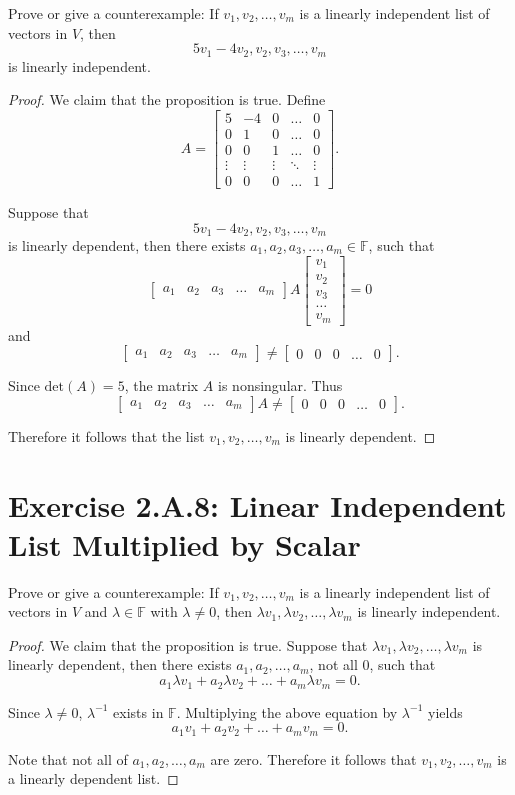 Prove or give a counterexample: If $v_1,v_2,\dots,v_m$ is a linearly independent list of vectors in $V$, then\[
5v_1-4v_2,v_2,v_3,\dots,v_m
\] is linearly independent.
\begin{proof}
We claim that the proposition is true. Define \[
A=\begin{bmatrix}
5&-4&0&\dots &0\\
0&1&0&\dots &0\\
0&0&1&\dots &0\\
\vdots&\vdots&\vdots&\ddots&\vdots\\
0&0&0&\dots &1
\end{bmatrix}.
\]

Suppose that \[
5v_1-4v_2,v_2,v_3,\dots,v_m
\] is linearly dependent, then there exists $a_1,a_2,a_3,\dots,a_m\in\mathbb{F}$, such that \[
\begin{bmatrix}
a_1&a_2&a_3&\dots &a_m
\end{bmatrix}
A
\begin{bmatrix}
v_1\\v_2\\v_3\\\dots\\v_m
\end{bmatrix}
=
0
\] and \[
\begin{bmatrix}
a_1&a_2&a_3&\dots &a_m
\end{bmatrix}\ne
\begin{bmatrix}
0&0&0&\dots &0
\end{bmatrix}.
\]

Since $\text{det}(A)=5$, the matrix $A$ is nonsingular. Thus \[
\begin{bmatrix}
a_1&a_2&a_3&\dots &a_m
\end{bmatrix}A\ne
\begin{bmatrix}
0&0&0&\dots &0
\end{bmatrix}.
\]

Therefore it follows that the list $v_1,v_2,\dots,v_m$ is linearly dependent.
\end{proof}

\section{Exercise 2.A.8: Linear Independent List Multiplied by Scalar}
Prove or give a counterexample: If $v_1,v_2,\dots,v_m$ is a linearly independent list of vectors in $V$ and $\lambda\in\mathbb{F}$ with $\lambda\ne 0$, then $\lambda v_1,\lambda v_2,\dots,\lambda v_m$ is linearly independent.
\begin{proof}
We claim that the proposition is true. Suppose that $\lambda v_1,\lambda v_2,\dots,\lambda v_m$ is linearly dependent, then there exists $a_1,a_2,\dots,a_m$, not all $0$, such that\[
a_1\lambda v_1+a_2\lambda v_2+\dots+a_m\lambda v_m=0.
\]

Since $\lambda\ne 0$, $\lambda^{-1}$ exists in $\mathbb{F}$. Multiplying the above equation by $\lambda^{-1}$ yields \[
a_1 v_1+a_2 v_2+\dots+a_m v_m=0.
\]

Note that not all of $a_1, a_2,\dots,a_m$ are zero. Therefore it follows that $v_1,v_2,\dots,v_m$ is a linearly dependent list.
\end{proof}

